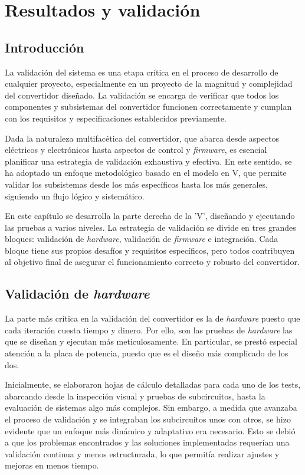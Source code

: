 \chapter{Resultados y validación}

\section{Introducción}
La validación del sistema es una etapa crítica en el proceso de desarrollo de cualquier proyecto, especialmente en un proyecto de la magnitud y complejidad del convertidor diseñado. La validación se encarga de verificar que todos los componentes y subsistemas del convertidor funcionen correctamente y cumplan con los requisitos y especificaciones establecidos previamente.

Dada la naturaleza multifacética del convertidor, que abarca desde aspectos eléctricos y electrónicos hasta aspectos de control y \textit{firmware}, es esencial planificar una estrategia de validación exhaustiva y efectiva. En este sentido, se ha adoptado un enfoque metodológico basado en el modelo en V, que permite validar los subsistemas desde los más específicos hasta los más generales, siguiendo un flujo lógico y sistemático. 

En este capítulo se desarrolla la parte derecha de la 'V', diseñando y ejecutando las pruebas a varios niveles. La estrategia de validación se divide en tres grandes bloques: validación de \textit{hardware}, validación de \textit{firmware} e integración. Cada bloque tiene sus propios desafíos y requisitos específicos, pero todos contribuyen al objetivo final de asegurar el funcionamiento correcto y robusto del convertidor.

\section{Validación de \textit{hardware}}
La parte más crítica en la validación del convertidor es la de \textit{hardware} puesto que cada iteración cuesta tiempo y dinero. Por ello, son las pruebas de \textit{hardware} las que se diseñan y ejecutan más meticulosamente. En particular, se prestó especial atención a la placa de potencia, puesto que es el diseño más complicado de los dos.

Inicialmente, se elaboraron hojas de cálculo detalladas para cada uno de los tests, abarcando desde la inspección visual y pruebas de subcircuitos, hasta la evaluación de sistemas algo más complejos. Sin embargo, a medida que avanzaba el proceso de validación y se integraban los subcircuitos unos con otros, se hizo evidente que un enfoque más dinámico y adaptativo era necesario. Esto se debió a que los problemas encontrados y las soluciones implementadas requerían una validación continua y menos estructurada, lo que permitía realizar ajustes y mejoras en menos tiempo.


